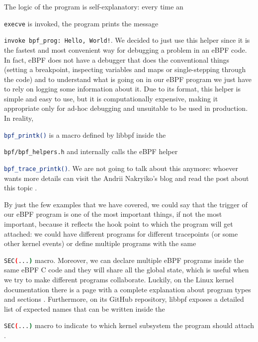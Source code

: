 The logic of the program is self-explanatory: every time an \raggedright\colorbox{backcolour}{\lstinline[style=commandline, language=bash]|execve|} is invoked, the program prints the message \raggedright\colorbox{backcolour}{\lstinline[style=commandline, language=bash]|invoke bpf_prog: Hello, World!|}.
We decided to just use this helper since it is the fastest and most convenient way for debugging a problem in an eBPF code.
In fact, eBPF does not have a debugger that does the conventional things (setting a breakpoint, inspecting variables and maps or single-stepping through the code) and to understand what is going on in our eBPF program we just have to rely on logging some information about it.
Due to its format, this helper is simple and easy to use, but it is computationally expensive, making it appropriate only for ad-hoc debugging and unsuitable to be used in production.
In reality, \raggedright\colorbox{backcolour}{\lstinline[style=commandline, language=bash]|bpf_printk()|} is a macro defined by libbpf inside the \raggedright\colorbox{backcolour}{\lstinline[style=commandline, language=bash]|bpf/bpf_helpers.h|} and internally calls the eBPF helper \raggedright\colorbox{backcolour}{\lstinline[style=commandline, language=bash]|bpf_trace_printk()|}.
We are not going to talk about this anymore: whoever wants more details can visit the Andrii Nakryiko's blog and read the post about this topic \cite{ANbpfprintk}.

By just the few examples that we have covered, we could say that the trigger of our eBPF program is one of the most important things, if not the most important, because it reflects the hook point to which the program will get attached: we could have different programs for different tracepoints (or some other kernel events) or define multiple programs with the same \raggedright\colorbox{backcolour}{\lstinline[style=commandline, language=bash]|SEC(...)|} macro.
Moreover, we can declare multiple eBPF programs inside the same eBPF C code and they will share all the global state, which is useful when we try to make different programs collaborate.
Luckily, on the Linux kernel documentation there is a page with a complete explanation about program types and sections \cite{SecLinuxKernelDoc}.
Furthermore, on its GitHub repository, libbpf exposes a detailed list of expected names that can be written inside the \raggedright\colorbox{backcolour}{\lstinline[style=commandline, language=bash]|SEC(...)|} macro to indicate to which kernel subsystem the program should attach \cite{SecListlibbpf}.

